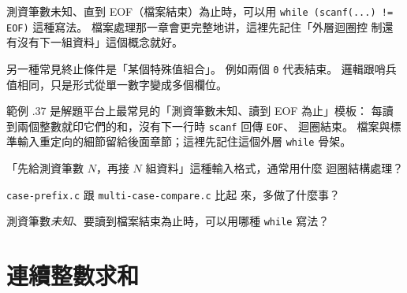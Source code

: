 
測資筆數未知、直到 EOF（檔案結束）為止時，可以用 \texttt{while (scanf(...)
!= EOF)} 這種寫法。 檔案處理那一章會更完整地讲，這裡先記住「外層迴圈控
制還有沒有下一組資料」這個概念就好。


另一種常見終止條件是「某個特殊值組合」。 例如兩個 \texttt{0} 代表結束。 
邏輯跟哨兵值相同，只是形式從單一數字變成多個欄位。


範例 \thechapter.37 是解題平台上最常見的「測資筆數未知、讀到 EOF 為止」模板：
每讀到兩個整數就印它們的和，沒有下一行時 \texttt{scanf} 回傳 \texttt{EOF}、
迴圈結束。 檔案與標準輸入重定向的細節留給後面章節；這裡先記住這個外層
\texttt{while} 骨架。




\begin{drills}[label=drills:loop-multi-case]
\item 「先給測資筆數 $N$，再接 $N$ 組資料」這種輸入格式，通常用什麼
迴圈結構處理？
\item \texttt{case-prefix.c} 跟 \texttt{multi-case-compare.c} 比起
來，多做了什麼事？
\item 測資筆數\emph{未知}、要讀到檔案結束為止時，可以用哪種
\texttt{while} 寫法？
\end{drills}

\section{連續整數求和}
\label{sec:loop-range-sum}

